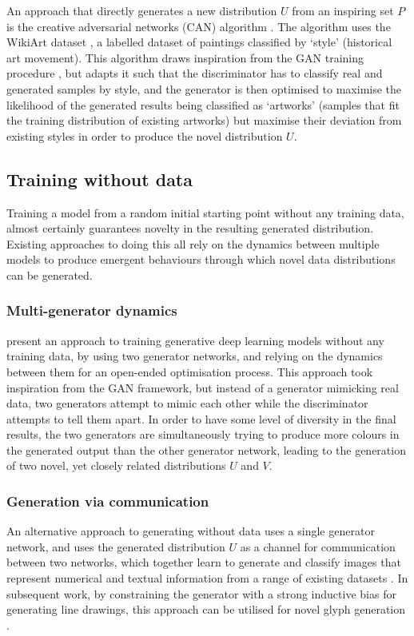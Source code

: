 An approach that directly generates a new distribution $U$ from an inspiring set $P$ is the creative adversarial networks (CAN) algorithm \citep{elgammal2017can}. 
The algorithm uses the WikiArt dataset \citep{saleh2016large}, a labelled dataset of paintings classified by `style' (historical art movement). This algorithm draws inspiration from the GAN training procedure \citep{goodfellow2014generative}, but adapts it such that the discriminator has to classify real and generated samples by style, and the generator is then optimised to maximise the likelihood of the generated results being classified as `artworks' (samples that fit the training distribution of existing artworks) but maximise their deviation from existing styles in order to produce the novel distribution $U$.

\subsection{Training without data}
\label{survey:nodata}


Training a model from a random initial starting point without any training data, almost certainly guarantees novelty in the resulting generated distribution. 
Existing approaches to doing this all rely on the dynamics between multiple models to produce emergent behaviours through which novel data distributions can be generated. 

\subsubsection{Multi-generator dynamics} \citet{broad2019searching} present an approach to training generative deep learning models without any training data, by using two generator networks, and relying on the dynamics between them for an open-ended optimisation process. 
This approach took inspiration from the GAN framework, but instead of a generator mimicking real data, two generators attempt to mimic each other while the discriminator attempts to tell them apart. 
In order to have some level of diversity in the final results, the two generators are simultaneously trying to produce more colours in the generated output than the other generator network, leading to the generation of two novel, yet closely related distributions $U$ and $V$.

\subsubsection{Generation via communication} An alternative approach to generating without data uses a single generator network, and uses the generated distribution $U$ as a channel for communication between two networks, which together learn to generate and classify images that represent numerical and textual information from a range of existing datasets \citep{simon2019dimensions}. 
In subsequent work, by constraining the generator with a strong inductive bias for generating line drawings, this approach can be utilised for novel glyph generation \citep{park2020generating}.


